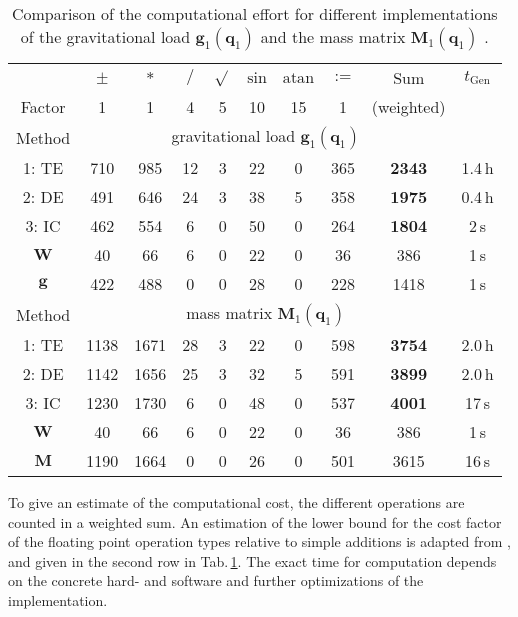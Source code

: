 \documentclass{svproc}
\newcommand{\bm}[1]{\boldsymbol{#1}}
\begin{document}
\begin{table}[tb]
    \caption{Comparison of the computational effort for different implementations of the gravitational load $\bm{g}_1(\bm{q}_1)$ and the mass matrix $\bm{M}_1(\bm{q}_1)$ .}
    \label{tab:computation}
    \centering
    \setlength\tabcolsep{3pt}
    \small
    \begin{tabular}[t]{|c|c|c|c|c|c|c|c|c|c|} 
        \hline
         & $\pm$ & $*$ & $/$ & $\sqrt{}$ & $\mathrm{sin}$ & $\mathrm{atan}$ & $:=$ & Sum & $t_{\mathrm{Gen}}$ \\
        Factor & 1 & 1 & 4 & 5 & 10 & 15 & 1 & (weighted) & \\
        \hline
        Method & \multicolumn{8}{c}{gravitational load $\bm{g}_1(\bm{q}_1)$} &  \\
        \hline
        \rowcolor{Gray}
        1: TE  & 710 & 985 & 12 & 3 & 22 & 0 & 365 & \textbf{2343} & 1.4\,h \\
        \rowcolor{Gray}
        2: DE & 491 & 646 & 24 & 3 & 38 & 5 & 358 & \textbf{1975} & 0.4\,h \\
        \rowcolor{Gray}
        3: IC & 462 & 554 & 6 & 0 & 50 & 0 & 264 & \textbf{1804} & 2\,s \\
        $\bm{W}$ & 40 & 66 & 6 & 0 & 22 & 0 & 36 & 386 & 1\,s \\
        $\bm{g}$ & 422 & 488 & 0 & 0 & 28 & 0 & 228 & 1418 & 1\,s \\
        \hline
        Method & \multicolumn{8}{c}{mass matrix $\bm{M}_1(\bm{q}_1)$} & \\
        \hline
        \rowcolor{Gray}
        1: TE  & 1138 & 1671 & 28 & 3 & 22 & 0 & 598 & \textbf{3754} & 2.0\,h \\
        \rowcolor{Gray}
        2: DE & 1142 & 1656 & 25 & 3 & 32 & 5 & 591 & \textbf{3899} & 2.0\,h \\
        \rowcolor{Gray}
        3: IC & 1230 & 1730 & 6 & 0 & 48 & 0 & 537 & \textbf{4001} & 17\,s \\
        $\bm{W}$ & 40 & 66 & 6 & 0 & 22 & 0 & 36 & 386 & 1\,s \\
        $\bm{M}$ & 1190 & 1664 & 0 & 0 & 26 & 0 & 501 & 3615 & 16\,s \\
        \hline
    \end{tabular}
    \vspace{-0.5cm}
\end{table}
%

To give an estimate of the computational cost, the different operations are counted in a weighted sum. An estimation of the lower bound for the cost factor of the floating point  operation types relative to simple additions is adapted from \cite{Atkinson2014}, \cite{Hindriksen2012} and given in the second row in Tab.\,\ref{tab:computation}.
The exact time for computation depends on the concrete hard- and software and further optimizations of the implementation.
\end{document}
